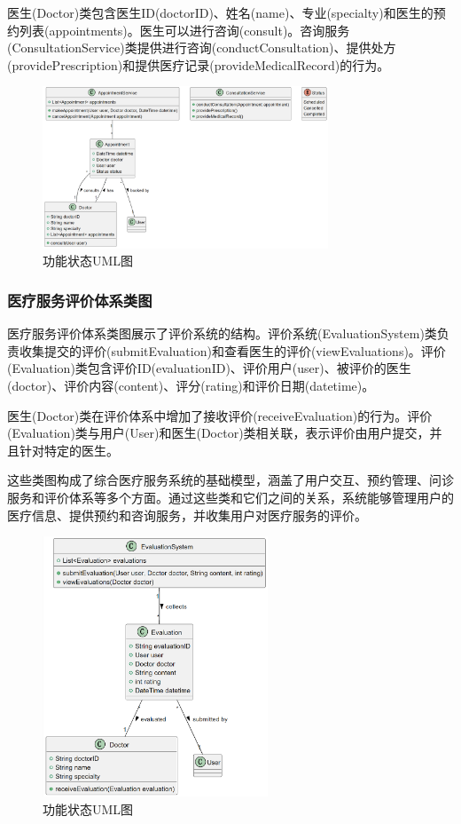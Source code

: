 医生(Doctor)类包含医生ID(doctorID)、姓名(name)、专业(specialty)和医生的预约列表(appointments)。医生可以进行咨询(consult)。咨询服务(ConsultationService)类提供进行咨询(conductConsultation)、提供处方(providePrescription)和提供医疗记录(provideMedicalRecord)的行为。
\begin{figure}[htbp]
	\centering
	\includegraphics[width=0.76\textwidth]{figures/06.png}
	\caption{功能状态UML图}
	\label{fig:functional_state_diagram}
\end{figure}

\subsubsection{医疗服务评价体系类图}
医疗服务评价体系类图展示了评价系统的结构。评价系统(EvaluationSystem)类负责收集提交的评价(submitEvaluation)和查看医生的评价(viewEvaluations)。评价(Evaluation)类包含评价ID(evaluationID)、评价用户(user)、被评价的医生(doctor)、评价内容(content)、评分(rating)和评价日期(datetime)。

医生(Doctor)类在评价体系中增加了接收评价(receiveEvaluation)的行为。评价(Evaluation)类与用户(User)和医生(Doctor)类相关联，表示评价由用户提交，并且针对特定的医生。

这些类图构成了综合医疗服务系统的基础模型，涵盖了用户交互、预约管理、问诊服务和评价体系等多个方面。通过这些类和它们之间的关系，系统能够管理用户的医疗信息、提供预约和咨询服务，并收集用户对医疗服务的评价。
\begin{figure}[htbp]
	\centering
	\includegraphics[width=0.6\textwidth]{figures/07.png}
	\caption{功能状态UML图}
	\label{fig:functional_state_diagram}
\end{figure}

